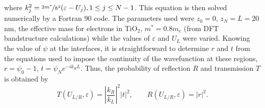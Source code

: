 where $k_j^2 = \nicefrac{2m^*}{\hbar^2}(\varepsilon-U_j), 1 \leq j \leq N-1$. This equation is then solved numerically by a Fortran 90 code. The parameters used were $z_0 = 0$, $z_N = L = 20$ nm, the effective mass for electrons in TiO$_2$, $m^* = 0.8m_e$ (from DFT bandstructure calculations) while the values of $\varepsilon$ and $U_L$ were varied. Knowing the value of $\psi$ at the interfaces, it is straightforward to determine $r$ and $t$ from the equations used to impose the continuity of the wavefunction at these regions, $r = \psi_0-1$, $t=\psi_Ne^{-ik_RL}$. Thus, the probability of reflection $R$ and transmission $T$ is obtained by \cite{Cohen-Tannoudji}
\begin{equation}
T(U_{L/R},\varepsilon) = \left|\frac{k_R}{k_L}\right|^2|t|^2, \qquad
R(U_{L/R},\varepsilon) = |r|^2.
\end{equation}

